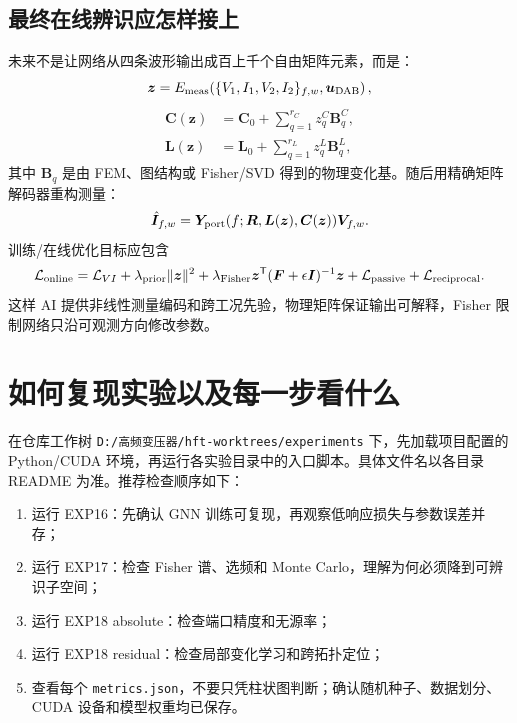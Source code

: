 \documentclass[UTF8,11pt,a4paper]{ctexart}
\newcommand{\mat}[1]{\bm{#1}}
\newcommand{\code}[1]{\texttt{#1}}
\begin{document}
\subsection{最终在线辨识应怎样接上}

未来不是让网络从四条波形输出成百上千个自由矩阵元素，而是：
\begin{equation}
 \bm z=E_{\rm meas}\!\left(\{V_1,I_1,V_2,I_2\}_{f,w},\bm u_{\rm DAB}\right),
\end{equation}
\begin{align}
 \mat C(\bm z)&=\mat C_0+\sum_{q=1}^{r_C}z_q^{C}\mat B_q^{C},\\
 \mat L(\bm z)&=\mat L_0+\sum_{q=1}^{r_L}z_q^{L}\mat B_q^{L},
\end{align}
其中 $\mat B_q$ 是由 FEM、图结构或 Fisher/SVD 得到的物理变化基。随后用精确矩阵解码器重构测量：
\begin{equation}
 \hat{\mat I}_{f,w}=\mat Y_{\rm port}(f;\mat R,\mat L(\bm z),\mat C(\bm z))\mat V_{f,w}.
\end{equation}
训练/在线优化目标应包含
\begin{equation}
 \mathcal L_{\rm online}=\mathcal L_{VI}+\lambda_{\rm prior}\|\bm z\|^2
 +\lambda_{\rm Fisher}\bm z^{\mathsf T}(\mat F+\epsilon\mat I)^{-1}\bm z
 +\mathcal L_{\rm passive}+\mathcal L_{\rm reciprocal}.
\end{equation}
这样 AI 提供非线性测量编码和跨工况先验，物理矩阵保证输出可解释，Fisher 限制网络只沿可观测方向修改参数。

\section{如何复现实验以及每一步看什么}

在仓库工作树 \code{D:/高频变压器/hft-worktrees/experiments} 下，先加载项目配置的 Python/CUDA 环境，再运行各实验目录中的入口脚本。具体文件名以各目录 README 为准。推荐检查顺序如下：
\begin{enumerate}
\item 运行 EXP16：先确认 GNN 训练可复现，再观察低响应损失与参数误差并存；
\item 运行 EXP17：检查 Fisher 谱、选频和 Monte Carlo，理解为何必须降到可辨识子空间；
\item 运行 EXP18 absolute：检查端口精度和无源率；
\item 运行 EXP18 residual：检查局部变化学习和跨拓扑定位；
\item 查看每个 \code{metrics.json}，不要只凭柱状图判断；确认随机种子、数据划分、CUDA 设备和模型权重均已保存。
\end{enumerate}
\end{document}
